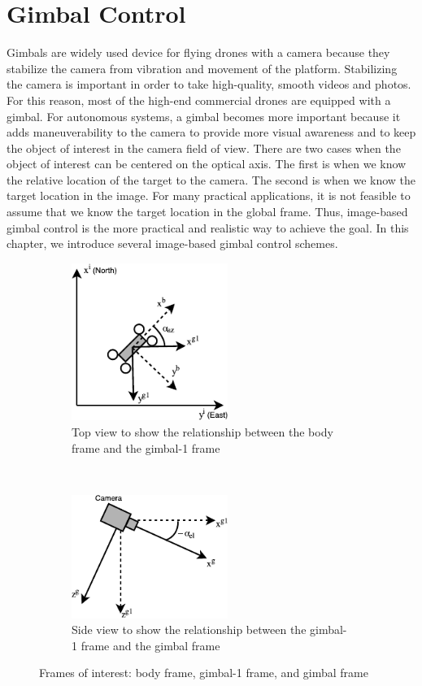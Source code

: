 \chapter{Gimbal Control}
\label{chp:chapter2}
\graphicspath{{figures/}{figures/chapter2/}}
Gimbals are widely used device for flying drones with a camera because they stabilize the camera from vibration and movement of the platform. Stabilizing the camera is important in order to take high-quality, smooth videos and photos. For this reason, most of the high-end commercial drones are equipped with a gimbal. For autonomous systems, a gimbal becomes more important because it adds maneuverability to the camera to provide more visual awareness and to keep the object of interest in the camera field of view. There are two cases when the object of interest can be centered on the optical axis. The first is when we know the relative location of the target to the camera. The second is when we know the target location in the image. For many practical applications, it is not feasible to assume that we know the target location in the global frame. Thus, image-based gimbal control is the more practical and realistic way to achieve the goal. In this chapter, we introduce several image-based gimbal control schemes.

\begin{figure}[htbp]
    \centering
    \begin{subfigure}[t]{0.5\textwidth}
    	\centering
    	\includegraphics[width=2in]{images/chapter2/gimbal1_frame}
    	\caption{Top view to show the relationship between the body frame and the gimbal-1 frame}
    \end{subfigure}%
    ~
    \begin{subfigure}[t]{0.5\textwidth}
    	\centering
    	\includegraphics[width=2in]{images/chapter2/gimbal_frame}
    	\caption{Side view to show the relationship between the gimbal-1 frame and the gimbal frame}
    \end{subfigure}
    \caption{Frames of interest: body frame, gimbal-1 frame, and gimbal frame}
    \label{gimbal_frame}
\end{figure}

